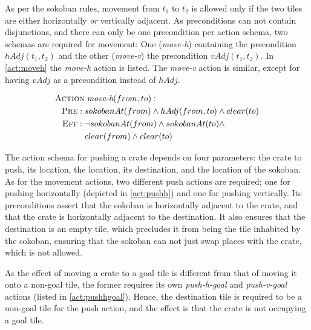 \documentclass[../Master.tex]{subfiles}
\begin{document}
As per the sokoban rules, movement from $t_1$ to $t_2$ is allowed only if the two tiles are either horizontally \textit{or} vertically adjacent. As preconditions can not contain disjunctions, and there can only be one precondition per action schema, two schemas are required for movement: One (\textit{move-h}) containing the precondition $hAdj(t_1,t_2)$ and the other (\textit{move-v}) the precondition $vAdj(t_1, t_2)$.
In \eqref{act:moveh} the \textit{move-h} action is listed. The \textit{move-v} action is similar, except for having $vAdj$ as a precondition instead of $hAdj$.

\begin{align}
\begin{split} \label{act:moveh}
    \textsc{Action} &\; \textit{move-h}(from, to): \\
    \textsc{Pre}: \; & sokobanAt(from) \land hAdj(from, to) \land clear(to) \\
    \textsc{Eff}: \; & \neg sokobanAt(from) \land sokobanAt(to) \land \\
                     & clear(from) \land clear(to)
\end{split}
\end{align}

The action schema for pushing a crate depends on four parameters: the crate to push, its location, the location, its destination, and the location of the sokoban. As for the movement actions, two different push actions are required; one for pushing horizontally (depicted in \eqref{act:pushh}) and one for pushing vertically. Its preconditions assert that the sokoban is horizontally adjacent to the crate, and that the crate is horizontally adjacent to the destination. It also ensures that the destination is an empty tile, which precludes it from being the tile inhabited by the sokoban, ensuring that the sokoban can not just swap places with the crate, which is not allowed.

As the effect of moving a crate to a goal tile is different from that of moving it onto a non-goal tile, the former requires its own \textit{push-h-goal}  and \textit{push-v-goal} actions (listed in \eqref{act:pushhgoal}). Hence, the destination tile is required to be a non-goal tile for the push action, and the effect is that the crate is not occupying a goal tile.
\end{document}
